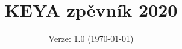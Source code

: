 \documentclass[twoside,12pt,a5paper]{article}
\title{KEYA zpěvník 2020}
\date{Verze: 1.0 (\today)}
\begin{document}
\maketitle
\cleardoublepage
\begin{multicols}{2}
\begin{footnotesize}
\tableofcontents{}
\end{footnotesize}
\end{multicols}
\clearpage

\end{document}
